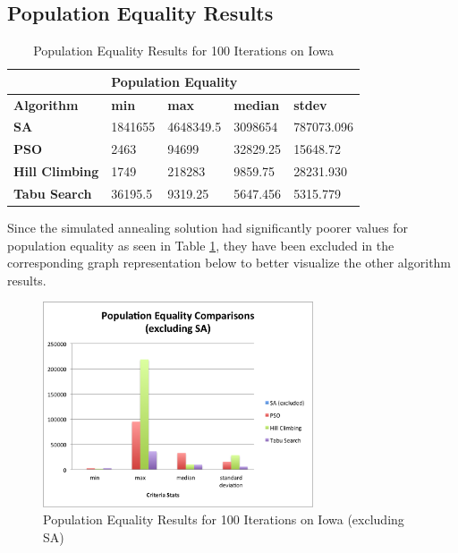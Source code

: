 \documentclass[journal]{IEEEtran}
\begin{document}
\subsection{Population Equality Results}

\begin{table}[!h]
\centering
\caption{Population Equality Results for 100 Iterations on Iowa}
\label{tab:pop_100iter}
\begin{tabular}{l|llll}
                       & \multicolumn{4}{l}{\textbf{Population Equality}}             \\ \hline
\textbf{Algorithm}     & \textbf{min} & \textbf{max} & \textbf{median} & \textbf{stdev} \\ \hline
\textbf{SA}            & 1841655      & 4648349.5    & 3098654         & 787073.096         \\
\textbf{PSO}           & 2463         & 94699        & 32829.25        & 15648.72           \\
\textbf{Hill Climbing} & 1749         & 218283       & 9859.75         & 28231.930        \\
\textbf{Tabu Search}   & 36195.5      & 9319.25         & 5647.456       & 5315.779     
\end{tabular}
\end{table}

Since the simulated annealing solution had significantly poorer values for population equality as seen in Table \ref{tab:pop_100iter}, they have been excluded in the corresponding graph representation below to better visualize the other algorithm results.

\begin{figure}[h!]
    \includegraphics[width=8cm]{images/pop_equality_graph.png}
    \centering
    \caption{Population Equality Results for 100 Iterations on Iowa (excluding SA)}
    \label{fig:pop_results}
\end{figure}
\end{document}
